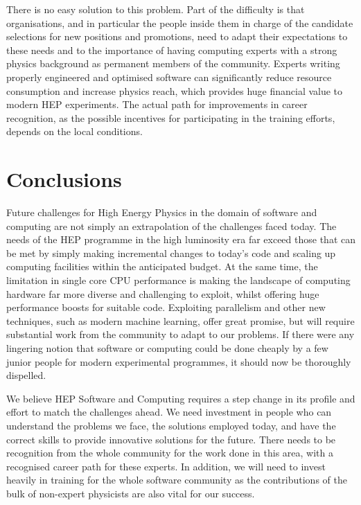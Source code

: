 There is no easy solution to this problem. Part of the difficulty is
that organisations, and in particular the people inside them in charge
of the candidate selections for new positions and promotions, need to
adapt their expectations to these needs and to the importance of having
computing experts with a strong physics background as permanent members
of the community. Experts writing properly engineered and optimised
software can significantly reduce resource consumption and increase
physics reach, which provides huge financial value to modern HEP
experiments. The actual path for improvements in career recognition, as
the possible incentives for participating in the training efforts,
depends on the local conditions.

\hypertarget{conclusions}{%
\section{Conclusions}\label{conclusions}}

Future challenges for High Energy Physics in the domain of software and
computing are not simply an extrapolation of the challenges faced today.
The needs of the HEP programme in the high luminosity era far exceed those
that can be met by simply making incremental changes to today's code and
scaling up computing facilities within the anticipated budget. At the
same time, the limitation in single core CPU performance is making the
landscape of computing hardware far more diverse and challenging to
exploit, whilst offering huge performance boosts for suitable code.
Exploiting parallelism and other new techniques, such as modern machine
learning, offer great promise, but will require substantial work from
the community to adapt to our problems. If there were any lingering
notion that software or computing could be done cheaply by a few junior
people for modern experimental programmes, it should now be thoroughly
dispelled.

We believe HEP Software and Computing requires a step change in its profile and
effort to match the challenges ahead. We need investment in people who
can understand the problems we face, the solutions employed today, and
have the correct skills to provide innovative solutions for the future.
There needs to be recognition from the whole community for the work done
in this area, with a recognised career path for these experts. In
addition, we will need to invest heavily in training for the whole
software community as the contributions of the bulk of non-expert
physicists are also vital for our success.

